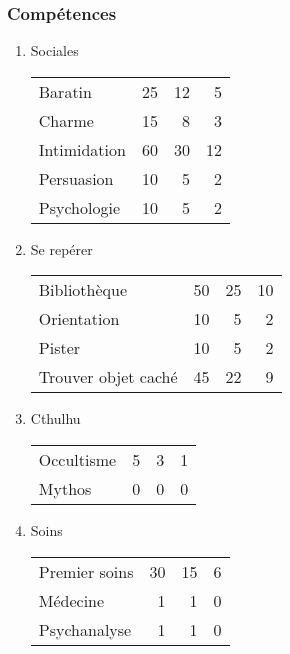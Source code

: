 \documentclass[11pt]{article}
\begin{document}
\begin{twocols}
\subsubsection{Compétences}
\label{sec:org21c2c2f}
\begin{enumerate}
\item Sociales
\label{sec:orge3ca601}

\begin{center}
\begin{tabular}{lrrr}
Baratin & 25 & 12 & 5\\
Charme & 15 & 8 & 3\\
Intimidation & 60 & 30 & 12\\
Persuasion & 10 & 5 & 2\\
Psychologie & 10 & 5 & 2\\
\end{tabular}
\end{center}

\item Se repérer
\label{sec:org37293d3}

\begin{center}
\begin{tabular}{lrrr}
Bibliothèque & 50 & 25 & 10\\
Orientation & 10 & 5 & 2\\
Pister & 10 & 5 & 2\\
Trouver objet caché & 45 & 22 & 9\\
\end{tabular}
\end{center}

\item Cthulhu
\label{sec:org8a799ca}

\begin{center}
\begin{tabular}{lrrr}
Occultisme & 5 & 3 & 1\\
Mythos & 0 & 0 & 0\\
\end{tabular}
\end{center}

\item Soins
\label{sec:orgc0102a6}

\begin{center}
\begin{tabular}{lrrr}
Premier soins & 30 & 15 & 6\\
Médecine & 1 & 1 & 0\\
Psychanalyse & 1 & 1 & 0\\
\end{tabular}
\end{center}


\end{enumerate}
\end{twocols}
\end{document}
